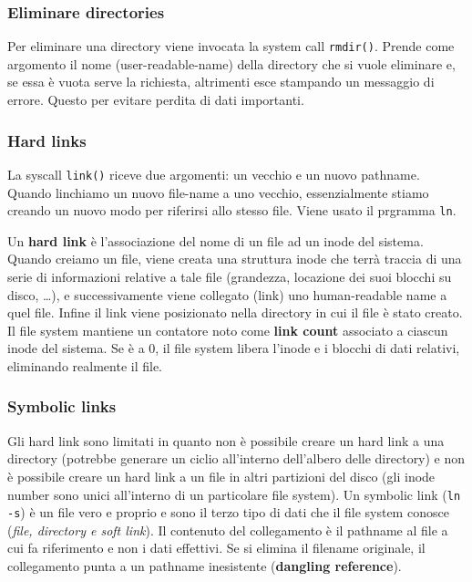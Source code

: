\documentclass[12pt, twoside, letterpaper]{article}
\begin{document}
			\subsubsection{Eliminare directories}
				Per eliminare una directory viene invocata la system call \texttt{rmdir()}. Prende come argomento il nome (user-readable-name) della directory che si vuole eliminare e, se essa è vuota serve la richiesta, altrimenti esce stampando un messaggio di errore. Questo per evitare perdita di dati importanti.
				
			\subsubsection{Hard links}
				La syscall \texttt{link()} riceve due argomenti: un vecchio e un nuovo pathname. Quando linchiamo un nuovo file-name a uno vecchio, essenzialmente stiamo creando un nuovo modo per riferirsi allo stesso file. Viene usato il prgramma \texttt{ln}.
				
				Un \textbf{hard link} è l'associazione del nome di un file ad un inode del sistema. Quando creiamo un file, viene creata una struttura inode che terrà traccia di una serie di informazioni relative a tale file (grandezza, locazione dei suoi blocchi su disco, \dots), e successivamente viene collegato (link) uno human-readable name a quel file. Infine il link viene posizionato nella directory in cui il file è stato creato. Il file system mantiene un contatore noto come \textbf{link count} associato a ciascun inode del sistema. Se è a 0, il file system libera l'inode e i blocchi di dati relativi, eliminando realmente il file.
				
			\subsubsection{Symbolic links}
				Gli hard link sono limitati in quanto non è possibile creare un hard link a una directory (potrebbe generare un ciclio all'interno dell'albero delle directory) e non è possibile creare un hard link a un file in altri partizioni del disco (gli inode number sono unici all'interno di un particolare file system).
				Un symbolic link (\texttt{ln -s}) è un file vero e proprio e sono il terzo tipo di dati che il file system conosce (\textit{file, directory e soft link}). Il contenuto del collegamento è il pathname al file a cui fa riferimento e non i dati effettivi. Se si elimina il filename originale, il collegamento punta a un pathname inesistente (\textbf{dangling reference}).
				
\end{document}
